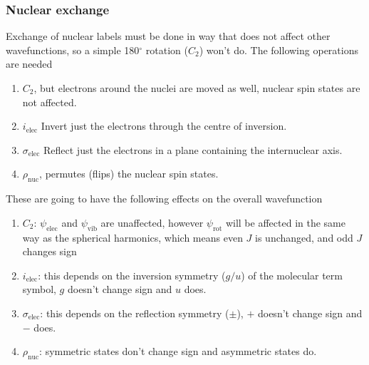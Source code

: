 \subsubsection{Nuclear exchange}
Exchange of nuclear labels must be done in way that does not affect other wavefunctions, so a simple 180$^{\circ}$ rotation ($C_2$) won't do. The following operations are needed
\begin{enumerate}
  \item $C_2$, but electrons around the nuclei are moved as well, nuclear spin states are not affected.
  \item $i_{\text{elec}}$ Invert just the electrons through the centre of inversion.
  \item $\sigma_{\text{elec}} $ Reflect just the electrons in a plane containing the internuclear axis.
  \item $\rho_{\text{nuc}}$, permutes (flips) the nuclear spin states.
\end{enumerate}
These are going to have the following effects on the overall wavefunction
\begin{enumerate}
  \item $C_2$: $\psi_{\text{elec}}$ and $\psi_{\text{vib}}$ are unaffected, however $\psi_{\text{rot}}$ will be affected in the same way as the spherical harmonics, which means even $J$ is unchanged, and odd $J$ changes sign
  \item $i_{\text{elec}}$: this depends on the inversion symmetry ($g/u$) of the molecular term symbol, $g$ doesn't change sign and $u$ does.
  \item $\sigma_{\text{elec}} $: this depends on the reflection symmetry ($\pm$), $+$ doesn't change sign and $-$ does.
  \item $\rho_{\text{nuc}}$: symmetric states don't change sign and asymmetric states do.
 \end{enumerate}
